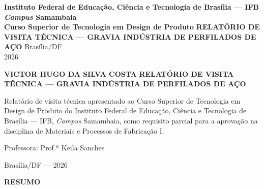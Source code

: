 \documentclass[12pt,a4paper,oneside,brazil,chapter=TITLE]{article}
\date{}
\begin{document}
\begin{titlepage}
  \thispagestyle{empty}
  \begin{center}
    {\normalsize\bfseries
      Instituto Federal de Educação, Ciência e Tecnologia de Brasília --- IFB\\[0.3em]
      \textit{Campus} Samambaia\\[0.3em]
      Curso Superior de Tecnologia em Design de Produto
    }
    \vfill
    {\large\bfseries RELATÓRIO DE VISITA TÉCNICA --- GRAVIA INDÚSTRIA DE PERFILADOS DE AÇO}
    \vfill
    {\normalsize Brasília/DF\\2026}
  \end{center}
\end{titlepage}
\setcounter{page}{2}

\begin{titlepage}
  \thispagestyle{empty}
  \begin{center}
    {\normalsize\bfseries VICTOR HUGO DA SILVA COSTA}
    \vfill
    {\large\bfseries RELATÓRIO DE VISITA TÉCNICA --- GRAVIA INDÚSTRIA DE PERFILADOS DE AÇO}
    \vfill
    \begin{flushright}
      \begin{minipage}{0.5\textwidth}
        \normalsize
        Relatório de visita técnica apresentado ao Curso Superior de Tecnologia em Design de Produto do Instituto Federal de Educação, Ciência e Tecnologia de Brasília --- IFB, \textit{Campus} Samambaia, como requisito parcial para a aprovação na disciplina de Materiais e Processos de Fabricação I.
        \vspace{1em}

        Professora: Prof.ª Keila Sanches
      \end{minipage}
    \end{flushright}
    \vfill
    {\normalsize Brasília/DF --- 2026}
  \end{center}
\end{titlepage}

\clearpage
\thispagestyle{plain}
\begin{center}
  {\normalsize\bfseries RESUMO}
\end{center}
\vspace{12pt}
\end{document}
